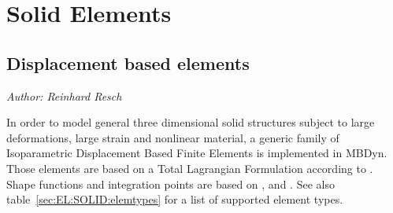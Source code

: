 %
%
%
%
%
%
%
%

\section{Solid Elements}
\label{sec:EL:SOLID}

\subsection{Displacement based elements}
\emph{Author: Reinhard Resch}

In order to model general three dimensional solid structures subject to large deformations,
large strain and nonlinear material, a generic family of Isoparametric Displacement Based Finite Elements is implemented in MBDyn.
Those elements are based on a Total Lagrangian Formulation according to \cite{BATHE2016}. Shape functions and integration points are based on \cite{BATHE2016}, \cite{DHONDT2004} and \cite{CODEASTERR30301}.
See also table~\ref{sec:EL:SOLID:elemtypes} for a list of supported element types.

